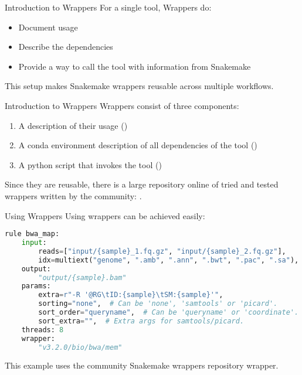 \begin{frame}{Introduction to Wrappers}
    For a single tool, \Snakemake{} Wrappers do:
    \begin{itemize}[<+->]
        \item Document usage
        \item Describe the dependencies
        \item Provide a way to call the tool with information from Snakemake
    \end{itemize}
    This setup makes Snakemake wrappers reusable across multiple workflows.
\end{frame}

\begin{frame}{Introduction to Wrappers}
    Wrappers consist of three components:
    \begin{enumerate}
        \item A description of their usage ()
        \item A conda environment description of all dependencies of the tool ()
        \item A python script that invokes the tool ()
    \end{enumerate}
    Since they are reusable, there is a large repository online of tried and tested 
    wrappers written by the community: .
\end{frame}

\begin{frame}[fragile]{Using Wrappers}
    Using \Snakemake{} wrappers can be achieved easily:
    \begin{lstlisting}[language=Python,style=Python]
rule bwa_map:
    input:
        reads=["input/{sample}_1.fq.gz", "input/{sample}_2.fq.gz"],
        idx=multiext("genome", ".amb", ".ann", ".bwt", ".pac", ".sa"),
    output:
        "output/{sample}.bam"
    params:
        extra=r"-R '@RG\tID:{sample}\tSM:{sample}'",
        sorting="none",  # Can be 'none', 'samtools' or 'picard'.
        sort_order="queryname",  # Can be 'queryname' or 'coordinate'.
        sort_extra="",  # Extra args for samtools/picard.
    threads: 8
    wrapper:
        "v3.2.0/bio/bwa/mem"
    \end{lstlisting}
    \begin{docs}
        This example uses the community Snakemake wrappers repository  wrapper.
    \end{docs}
\end{frame}

